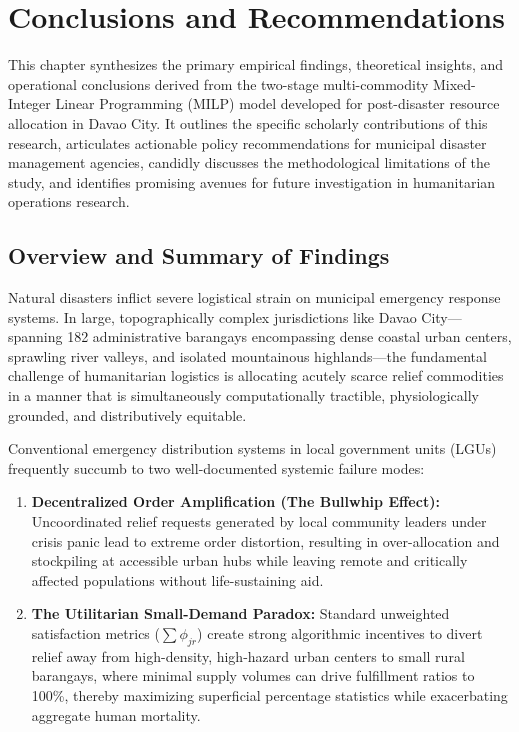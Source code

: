 \chapter{Conclusions and Recommendations}
\label{ch:conclusions_and_recommendations}

This chapter synthesizes the primary empirical findings, theoretical insights, and operational conclusions derived from the two-stage multi-commodity Mixed-Integer Linear Programming (MILP) model developed for post-disaster resource allocation in Davao City. It outlines the specific scholarly contributions of this research, articulates actionable policy recommendations for municipal disaster management agencies, candidly discusses the methodological limitations of the study, and identifies promising avenues for future investigation in humanitarian operations research.

\section{Overview and Summary of Findings}
\label{sec:summary_of_findings}

Natural disasters inflict severe logistical strain on municipal emergency response systems. In large, topographically complex jurisdictions like Davao City---spanning 182 administrative barangays encompassing dense coastal urban centers, sprawling river valleys, and isolated mountainous highlands---the fundamental challenge of humanitarian logistics is allocating acutely scarce relief commodities in a manner that is simultaneously computationally tractible, physiologically grounded, and distributively equitable. 

Conventional emergency distribution systems in local government units (LGUs) frequently succumb to two well-documented systemic failure modes:
\begin{enumerate}
    \item \textbf{Decentralized Order Amplification (The Bullwhip Effect):} Uncoordinated relief requests generated by local community leaders under crisis panic lead to extreme order distortion, resulting in over-allocation and stockpiling at accessible urban hubs while leaving remote and critically affected populations without life-sustaining aid.
    \item \textbf{The Utilitarian Small-Demand Paradox:} Standard unweighted satisfaction metrics ($\sum \phi_{jr}$) create strong algorithmic incentives to divert relief away from high-density, high-hazard urban centers to small rural barangays, where minimal supply volumes can drive fulfillment ratios to 100\%, thereby maximizing superficial percentage statistics while exacerbating aggregate human mortality.
\end{enumerate}

